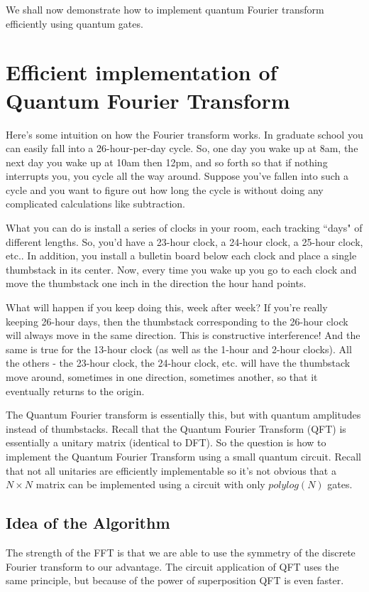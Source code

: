 We shall now demonstrate how to implement quantum Fourier transform efficiently using quantum gates.

\section{Efficient implementation of Quantum Fourier Transform}
Here's some intuition on how the Fourier transform works. In graduate school you can easily fall into a 26-hour-per-day cycle. So, one day you wake up at 8am, the next day you wake up at 10am then 12pm, and so forth so that if nothing interrupts you, you cycle all the way around. Suppose you've fallen into such a cycle and you want to figure out how long the cycle is without doing any complicated calculations like subtraction.

What you can do is install a series of clocks in your room, each tracking ``days" of different lengths. So, you'd have a 23-hour clock, a 24-hour clock, a 25-hour clock, etc.. In addition, you install a bulletin board below each clock and place a single thumbstack in its center. Now, every time you wake up you go to each clock and move the thumbstack one inch in the direction the hour hand points.

What will happen if you keep doing this, week after week? If you're really keeping 26-hour days, then the thumbstack corresponding to the 26-hour clock will always move in the same direction. This is constructive interference! And the same is true for the 13-hour clock (as well as the 1-hour and 2-hour clocks). All the others - the 23-hour clock, the 24-hour clock, etc. will have the thumbstack move around, sometimes in one direction, sometimes another, so that it eventually returns to the origin.

The Quantum Fourier transform is essentially this, but with quantum amplitudes instead of thumbstacks. Recall that the Quantum Fourier Transform (QFT) is essentially a unitary matrix (identical to DFT). So the question is how to implement the Quantum Fourier Transform using a small quantum circuit. Recall that not all unitaries are efficiently implementable so it's not obvious that a $N\times N$ matrix can be implemented using a circuit with only $polylog(N)$ gates.
\subsection{Idea of the Algorithm}
The strength of the FFT is that we are able to use the symmetry of the discrete Fourier transform to our advantage.
The circuit application of QFT uses the same principle, but because of the power of superposition QFT is even faster.

